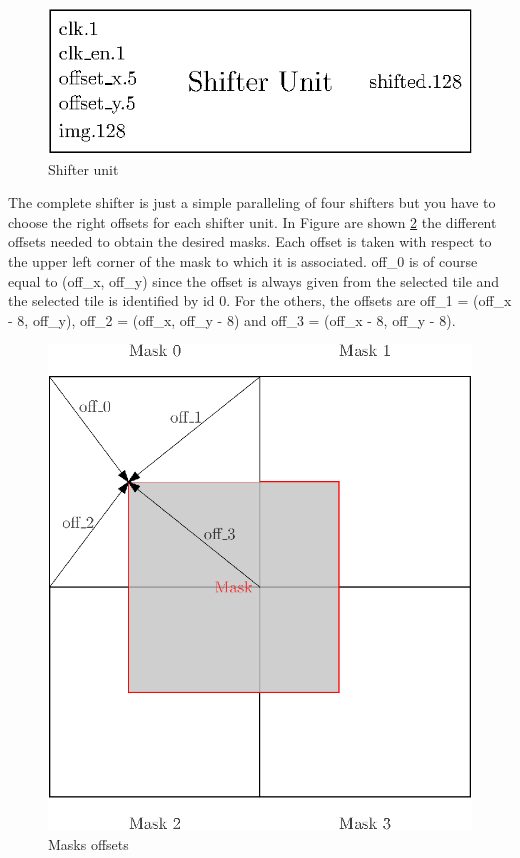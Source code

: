 \begin{figure}[H]
    \centering
    \includegraphics[scale=0.8]{Chapter4-GPU_CLKU/res/shifter_unit}
    \caption{Shifter unit}
    \label{fig:gpu/shifter_unit}
\end{figure}

The complete shifter is just a simple paralleling of four shifters but you have to choose the right 
offsets for each shifter unit. In Figure are shown \ref{fig:gpu/shifter_offsets}
the different offsets needed to obtain the desired masks. Each offset is taken with respect to the 
upper left corner of the mask to which it is associated. off\_0 is of course equal to 
(off\_x, off\_y) since the offset is always given from the selected tile and the selected tile is 
identified by id 0. For the others, the offsets are off\_1 = (off\_x - 8, off\_y), off\_2 = 
(off\_x, off\_y - 8) and off\_3 = (off\_x - 8, off\_y - 8).

\begin{figure}[H]
    \centering
    \includegraphics[scale=1.0]{Chapter4-GPU_CLKU/res/shifter_offsets}
    \caption{Masks offsets}
    \label{fig:gpu/shifter_offsets}
\end{figure}

